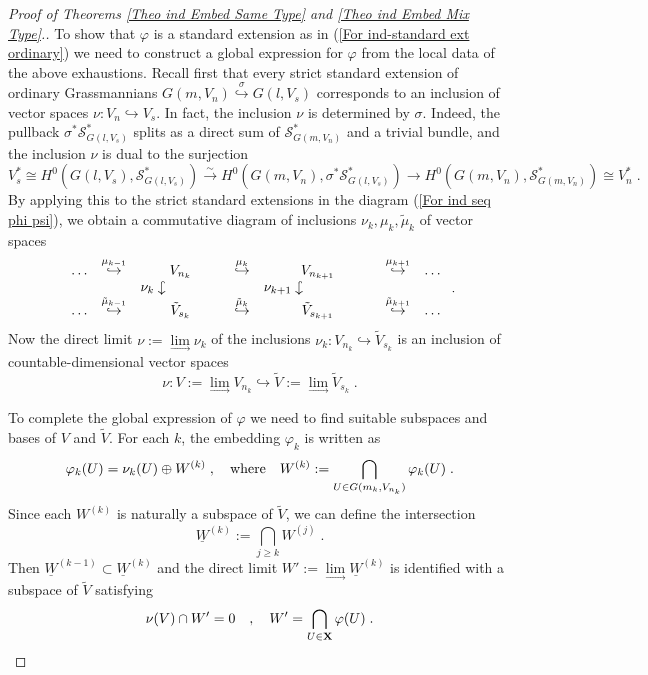 \documentclass[12pt]{amsart}
\def\hw  {\hookrightarrow}
\def\mc {\mathcal}
\def\ul  {\underline}
\newcommand{\hdw}{\mathrel{\rotatebox[origin=c]{-90}{$\hookrightarrow$}}}
\begin{document}
\begin{proof}[Proof of Theorems \ref{Theo ind Embed Same Type} and \ref{Theo ind Embed Mix Type}.]
To show that $\varphi$ is a standard extension as in (\ref{For ind-standard ext ordinary}) we need to construct a global expression for $\varphi$ from the local data of the above exhaustions. Recall first that every strict standard extension of ordinary Grassmannians $G(m,V_n)\stackrel{\sigma}{\hw}G(l,V_s)$ corresponds to an inclusion of vector spaces $\nu:V_n\hw V_s$. In fact, the inclusion $\nu$ is determined by $\sigma$. Indeed, the pullback $\sigma^*\mc S^*_{G(l,V_s)}$ splits as a direct sum of $\mc S^*_{G(m,V_n)}$ and a trivial bundle, and the inclusion $\nu$ is dual to the surjection 
$$
V_s^*\cong H^0(G(l,V_s),\mc S^*_{G(l,V_s)})\stackrel{\sim}{\to} H^0(G(m,V_n),\sigma^*\mc S^*_{G(l,V_s)}) \to H^0(G(m,V_n),\mc S^*_{G(m,V_n)})\cong V_n^*\;.
$$
By applying this to the strict standard extensions in the diagram (\ref{For ind seq phi psi}), we obtain a commutative diagram of inclusions $\nu_k,\mu_k,\tilde\mu_k$ of vector spaces 
\begin{gather}\label{For ind seq v n v s}
\begin{array}{ccccccc}
\dots & \stackrel{\mu_{k-1}}{\hw} & V_{n_k} & \stackrel{\mu_k}{\hw} & V_{n_{k+1}} & \stackrel{\mu_{k+1}}{\hw} & \dots \\
 &  & \nu_{k}\hdw\qquad\qquad &  & \nu_{k+1}\hdw\qquad\qquad\quad &  & \\
\dots & \stackrel{\tilde\mu_{k-1}}{\hw} & \tilde V_{s_k} & \stackrel{\tilde\mu_k}{\hw} & \tilde V_{s_{k+1}} & \stackrel{\tilde\mu_{k+1}}{\hw} & \dots 
\end{array}\;.
\end{gather}
Now the direct limit $\nu:=\lim\limits_{\to}\nu_k$ of the inclusions $\nu_k:V_{n_k}\hw \tilde V_{s_k}$ is an inclusion of countable-dimensional vector spaces
$$
\nu:V:=\lim\limits_\to V_{n_k}\hw \tilde V:=\lim\limits_\to \tilde V_{s_k} \;.
$$

To complete the global expression of $\varphi$ we need to find suitable subspaces and bases of $V$ and $\tilde V$. For each $k$, the embedding $\varphi_k$ is written as
$$
\varphi_k(U)=\nu_k(U)\oplus W^{(k)}\;, \quad{\rm where}\quad W^{(k)}:= \bigcap\limits_{U\in G(m_k,V_{n_k})} \varphi_k(U)\;.
$$
Since each $W^{(k)}$ is naturally a subspace of $\tilde V$, we can define the intersection
$$
\ul{W}^{(k)}:=\bigcap\limits_{j\geq k} W^{(j)} \;.
$$
Then $\ul{W}^{(k-1)}\subset \ul{W}^{(k)}$ and the direct limit $W':=\lim\limits_{\to}\ul{W}^{(k)}$ is identified with a subspace of $\tilde V$ satisfying
$$
\nu(V)\cap W'=0 \quad,\quad W'=\bigcap\limits_{U\in{\bf X}}\varphi(U) \;.
$$


\end{proof}
\end{document}
